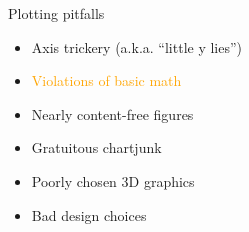 \documentclass[
  ignorenonframetext,
]{beamer}
\providecommand{\tightlist}{%
  \setlength{\itemsep}{0pt}\setlength{\parskip}{0pt}}
\begin{document}
\begin{frame}{Plotting pitfalls}
\label{plotting-pitfalls-1}
\begin{itemize}
\tightlist
\item
  Axis trickery (a.k.a. ``little y lies'')
\item
  \textcolor{orange}{Violations of basic math}
\item
  Nearly content-free figures
\item
  Gratuitous chartjunk
\item
  Poorly chosen 3D graphics
\item
  Bad design choices
\end{itemize}
\end{frame}

\begin{frame}{}
\label{section-10}
\end{frame}

\begin{frame}{}
\label{section-11}
\end{frame}
\end{document}
